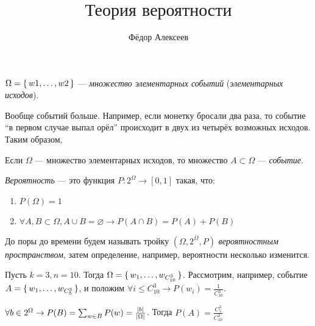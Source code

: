 



\title{$\mbox{Теория вероятности}$}
\author{Фёдор Алексеев}

\maketitle
\gitlink\tableofcontents

\begin{define*}
  $\Omega = \set{w1, \ldots, w2}$ --- \emph{множество элементарных событий} (\emph{элементарных исходов}).
\end{define*}

Вообще событий больше. Например, если монетку бросали два раза, то событие ``в первом случае выпал орёл'' происходит в двух из 
четырёх возможных исходов. Таким образом,

\begin{define*}
  Если $\Omega$ --- множество элементарных исходов, то множество $A \subset \Omega$ --- \emph{событие}.
\end{define*}

\begin{define*}[Временное]
  \emph{Вероятность} --- это функция $P: 2^{\Omega} \to [0, 1]$ такая, что:
  \begin{enumerate}
	\item $P(\Omega) = 1$
	\item $\forall A, B \subset \Omega, A \cup B = \varnothing \to P(A\cap B) = P(A) + P(B)$
  \end{enumerate}
\end{define*}

\begin{define*}[Временное]
  До поры до времени будем называть тройку $(\Omega, 2^{\Omega}, P)$ \emph{вероятностным пространством}, затем определение, например,
  вероятности несколько изменится.
\end{define*}

\begin{example} $ $ \\
  Пусть $k = 3, n = 10$. Тогда $\Omega = \set{w_1, \ldots, w_{C_{10}^{3}}}$. 
  Рассмотрим, например, событие $A = \set{w_1, \ldots, w_{C_{5}^{3}}}$, и положим $\forall i \le C_{10}^{3} \to P(w_i) = \frac{1}{C_{10}^{3}}$.

  $\forall	b \in 2^{\Omega} \to P(B) = \sum_{w\in B} P(w) = \frac{\left\lvert b \right\rvert}{\left\lvert \Omega \right\rvert}$. Тогда $P(A) = \frac{C_{5}^{3}}{C_{10}^{3}}$
\end{example}

